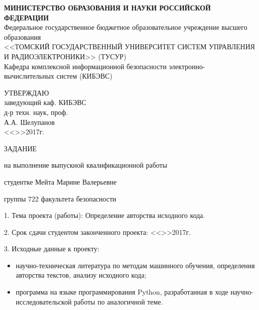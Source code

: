  \newpage

\begin{center}
 \textbf{МИНИСТЕРСТВО ОБРАЗОВАНИЯ И НАУКИ РОССИЙСКОЙ ФЕДЕРАЦИИ}\\
 Федеральное государственное бюджетное образовательное учреждение высшего образования\\
 <<ТОМСКИЙ ГОСУДАРСТВЕННЫЙ УНИВЕРСИТЕТ СИСТЕМ УПРАВЛЕНИЯ И РАДИОЭЛЕКТРОНИКИ>> (ТУСУР)\\
 Кафедра комплексной информационной безопасности электронно-вычислительных систем (КИБЭВС)\\
\end{center} 

\vfill

\begin{flushright}
\begin{minipage}{0.45\textwidth}
 \begin{flushleft}
  УТВЕРЖДАЮ\\
  заведующий каф. КИБЭВС\\
  д-р техн. наук, проф.\\
  \underline{\hspace{3cm}}А.А. Шелупанов \\
  <<\underline{\hspace{1cm}}>>\underline{\hspace{3cm}}2017г.\\
 \end{flushleft}
\end{minipage}
\end{flushright}

\vfill



\begin{center}
ЗАДАНИЕ

на выполнение выпускной квалификационной работы

студентке Мейта Марине Валерьевне

группы 722 факультета безопасности
\end{center}


1. Тема проекта (работы): Определение авторства исходного кода.

2. Срок сдачи студентом законченного проекта:
<<\underline{\hspace{1cm}}>>\underline{\hspace{3cm}}2017г.

3. Исходные данные к проекту:
\begin{itemize}
 \item научно-техническая литература по методам машинного обучения,
определения авторства текстов, анализу исходного кода;
 \item программа на языке программирования Python, разработанная в ходе
научно-исследовательской работы по аналогичной теме.
\end{itemize}

